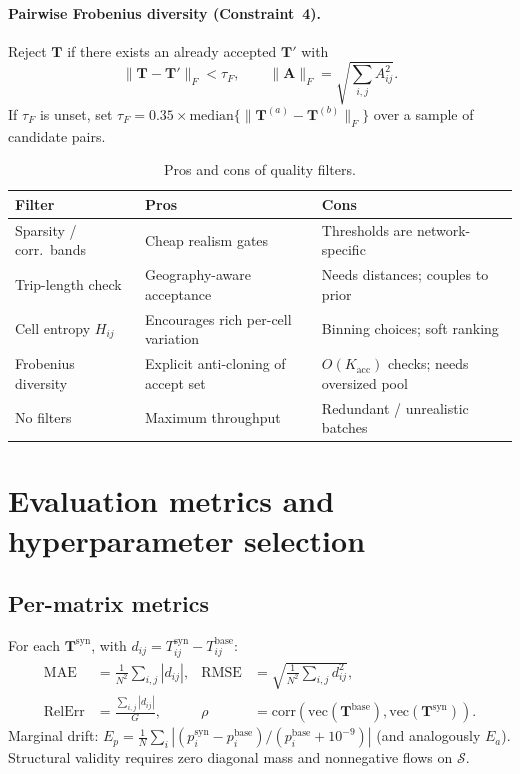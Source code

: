 \documentclass[11pt,a4paper]{report}
\newcommand{\Tbase}{\mathbf{T}^{\mathrm{base}}}
\newcommand{\Tsyn}{\mathbf{T}^{\mathrm{syn}}}
\newcommand{\mathbfT}{\mathbf{T}}
\newcommand{\mathbfA}{\mathbf{A}}
\begin{document}
\paragraph{Pairwise Frobenius diversity (Constraint~4).}
Reject $\mathbfT$ if there exists an already accepted $\mathbfT'$ with
\begin{equation}
    \|\mathbfT-\mathbfT'\|_F
    < \tau_F,
    \qquad
    \|\mathbfA\|_F=\sqrt{\sum_{i,j} A_{ij}^2}.
    \label{eq:frobenius}
\end{equation}
If $\tau_F$ is unset, set $\tau_F = 0.35\times\mathrm{median}\{\|\mathbfT^{(a)}-\mathbfT^{(b)}\|_F\}$ over a sample of candidate pairs.

\begin{table}[ht]
\centering
\caption{Pros and cons of quality filters.}
\label{tab:pros_filters}
\small
\begin{tabular}{@{}p{3.2cm}p{5.1cm}p{5.1cm}@{}}
\toprule
\textbf{Filter} & \textbf{Pros} & \textbf{Cons} \\
\midrule
Sparsity / corr.\ bands &
Cheap realism gates &
Thresholds are network-specific \\
Trip-length check &
Geography-aware acceptance &
Needs distances; couples to prior \\
Cell entropy $H_{ij}$ &
Encourages rich per-cell variation &
Binning choices; soft ranking \\
Frobenius diversity &
Explicit anti-cloning of accept set &
$O(K_{\mathrm{acc}})$ checks; needs oversized pool \\
No filters &
Maximum throughput &
Redundant / unrealistic batches \\
\bottomrule
\end{tabular}
\end{table}


\section{Evaluation metrics and hyperparameter selection}
\label{sec:ch1-metrics}

\subsection{Per-matrix metrics}

For each $\Tsyn$, with $d_{ij}=T^{\mathrm{syn}}_{ij}-T^{\mathrm{base}}_{ij}$:
\begin{align}
    \mathrm{MAE} &= \frac{1}{N^2}\sum_{i,j}|d_{ij}|, &
    \mathrm{RMSE} &= \sqrt{\frac{1}{N^2}\sum_{i,j}d_{ij}^2}, \\
    \mathrm{RelErr} &= \frac{\sum_{i,j}|d_{ij}|}{G}, &
    \rho &= \mathrm{corr}(\mathrm{vec}(\Tbase),\mathrm{vec}(\Tsyn)).
\end{align}
Marginal drift: $E_p = \frac{1}{N}\sum_i|({p_i^{\mathrm{syn}}-p_i^{\mathrm{base}}})/({p_i^{\mathrm{base}}+10^{-9}})|$ (and analogously $E_a$). Structural validity requires zero diagonal mass and nonnegative flows on $\mathcal{S}$.
\end{document}
